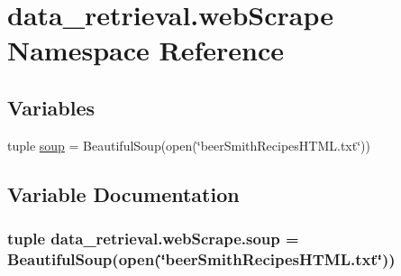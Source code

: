 \hypertarget{namespacedata__retrieval_1_1web_scrape}{}\section{data\+\_\+retrieval.\+web\+Scrape Namespace Reference}
\label{namespacedata__retrieval_1_1web_scrape}
\subsection*{Variables}
\begin{DoxyCompactItemize}
\item 
tuple \hyperlink{namespacedata__retrieval_1_1web_scrape_aff7336a618d26f879ecc298a1fdf4ef4}{soup} = Beautiful\+Soup(open(\char`\"{}beer\+Smith\+Recipes\+H\+T\+M\+L.\+txt\char`\"{}))
\end{DoxyCompactItemize}


\subsection{Variable Documentation}
\hypertarget{namespacedata__retrieval_1_1web_scrape_aff7336a618d26f879ecc298a1fdf4ef4}{}
\subsubsection[{soup}]{\setlength{\rightskip}{0pt plus 5cm}tuple data\+\_\+retrieval.\+web\+Scrape.\+soup = Beautiful\+Soup(open(\char`\"{}beer\+Smith\+Recipes\+H\+T\+M\+L.\+txt\char`\"{}))}\label{namespacedata__retrieval_1_1web_scrape_aff7336a618d26f879ecc298a1fdf4ef4}
